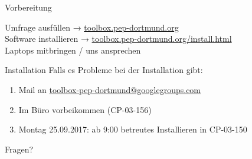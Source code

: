\begin{frame}{Vorbereitung}
  \begin{center}
    \huge
    Umfrage ausfüllen → \href{http://toolbox.pep-dortmund.org}{toolbox.pep-dortmund.org} \\[0.5\baselineskip]
    Software installieren → \href{http://toolbox.pep-dortmund.org/install.html}{toolbox.pep-dortmund.org/install.html} \\[1\baselineskip]
    Laptops mitbringen / uns ansprechen
  \end{center}
\end{frame}
\begin{frame}{Installation}
  \huge
  Falls es Probleme bei der Installation gibt:\\[0.5\baselineskip]
  \begin{enumerate}
    \item Mail an \href{mailto:toolbox-pep-dortmund@googlegroups.com}{toolbox-pep-dortmund@googlegroups.com}
    \item Im Büro vorbeikommen (CP-03-156)
    \item Montag 25.09.2017: ab 9:00 betreutes Installieren in CP-03-150
  \end{enumerate}
\end{frame}
\begin{frame}
  \Huge\centering
  \textcolor{red!70!black}{Fragen?}
\end{frame}

